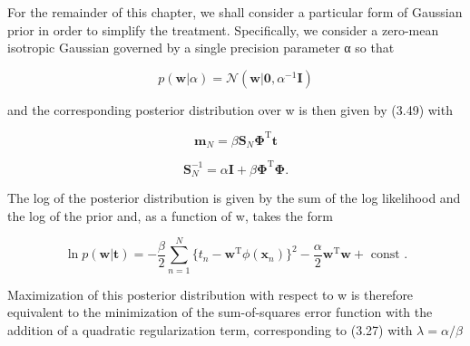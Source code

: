 \documentclass[
  10
]{article}
\begin{document}
For the remainder of this chapter, we shall consider a particular form
of Gaussian prior in order to simplify the treatment. Specifically, we
consider a zero-mean isotropic Gaussian governed by a single precision
parameter α so that

\[
p (\mathbf {w} | \alpha) = \mathcal {N} (\mathbf {w} | \mathbf {0}, \alpha^ {- 1} \mathbf {I})\tag{3.52}
\]

and the corresponding posterior distribution over w is then given by
(3.49) with

\[
{\mathbf m} _ {N} = \beta {\mathbf S} _ {N} {\mathbf \Phi} ^ {\mathrm{T}} {\mathbf t}\tag{3.53}
\]

\[
{\mathbf S} _ {N} ^ {- 1} = \alpha {\mathbf I} + \beta {\mathbf \Phi} ^ {\mathrm{T}} {\mathbf \Phi}.\tag{3.54}
\]

The log of the posterior distribution is given by the sum of the log
likelihood and the log of the prior and, as a function of w, takes the
form

\[
\ln p (\mathbf {w} | \mathbf {t}) = - \frac {\beta}{2} \sum_ {n = 1} ^ {N} \{t _ {n} - \mathbf {w} ^ {\mathrm{T}} \phi (\mathbf {x} _ {n}) \} ^ {2} - \frac {\alpha}{2} \mathbf {w} ^ {\mathrm{T}} \mathbf {w} + \text { const }.\tag{3.55}
\]

Maximization of this posterior distribution with respect to w is
therefore equivalent to the minimization of the sum-of-squares error
function with the addition of a quadratic regularization term,
corresponding to (3.27) with \(\lambda = \alpha / \beta\)
\end{document}
